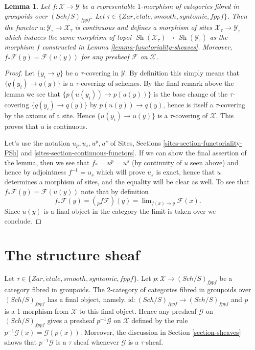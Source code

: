 \documentclass{stacks-project}
\theoremstyle{plain}
\newtheorem{lemma}[subsection]{Lemma}
\theoremstyle{definition}
\theoremstyle{remark}
\numberwithin{equation}{subsection}
\def\lim{\mathop{\mathrm{lim}}\nolimits}
\def\Sch{\mathit{Sch}}
\def\Sh{\mathop{\mathit{Sh}}\nolimits}
\def\etale{{\acute{e}tale}}
\begin{document}
\begin{lemma}
\label{lemma-representable-pushforward}
Let $f : \mathcal{X} \to \mathcal{Y}$ be a representable $1$-morphism of
categories fibred in groupoids over $(\Sch/S)_{fppf}$. Let
$\tau \in \{Zar, \etale, smooth, syntomic, fppf\}$.
Then the functor $u : \mathcal{Y}_\tau \to \mathcal{X}_\tau$ is continuous
and defines a morphism of sites $\mathcal{X}_\tau \to \mathcal{Y}_\tau$
which induces the same morphism of topoi
$\Sh(\mathcal{X}_\tau) \to \Sh(\mathcal{Y}_\tau)$
as the morphism $f$ constructed in
Lemma \ref{lemma-functoriality-sheaves}.
Moreover, $f_*\mathcal{F}(y) = \mathcal{F}(u(y))$ for any presheaf
$\mathcal{F}$ on $\mathcal{X}$.
\end{lemma}

\begin{proof}
Let $\{y_i \to y\}$ be a $\tau$-covering in $\mathcal{Y}$. By definition
this simply means that $\{q(y_i) \to q(y)\}$ is a $\tau$-covering of
schemes. By the final remark above the lemma we see that
$\{p(u(y_i)) \to p(u(y))\}$ is the base change of the $\tau$-covering
$\{q(y_i) \to q(y)\}$ by $p(u(y)) \to q(y)$, hence is itself a
$\tau$-covering by the axioms of a site. Hence $\{u(y_i) \to u(y)\}$
is a $\tau$-covering of $\mathcal{X}$. This proves that $u$ is
continuous.

\medskip\noindent
Let's use the notation $u_p, u_s, u^p, u^s$ of
Sites, Sections \ref{sites-section-functoriality-PSh} and
\ref{sites-section-continuous-functors}.
If we can show the final assertion of the lemma, then we see that
$f_* = u^p = u^s$ (by continuity of $u$ seen above) and hence by adjointness
$f^{-1} = u_s$ which will prove $u_s$ is exact, hence that $u$ determines
a morphism of sites, and the equality will be clear as well.
To see that $f_*\mathcal{F}(y) = \mathcal{F}(u(y))$ note that by
definition
$$
f_*\mathcal{F}(y) = ({}_pf\mathcal{F})(y) =
\lim_{f(x) \to y} \mathcal{F}(x).
$$
Since $u(y)$ is a final object in the category the limit is taken
over we conclude.
\end{proof}





\section{The structure sheaf}
\label{section-structure-sheaf}

\noindent
Let $\tau \in \{Zar, \etale, smooth, syntomic, fppf\}$.
Let $p : \mathcal{X} \to (\Sch/S)_{fppf}$ be a category
fibred in groupoids. The 2-category of categories fibred in groupoids over
$(\Sch/S)_{fppf}$ has a final object, namely,
$\text{id} : (\Sch/S)_{fppf} \to (\Sch/S)_{fppf}$
and $p$ is a $1$-morphism from $\mathcal{X}$ to this final object.
Hence any presheaf $\mathcal{G}$ on $(\Sch/S)_{fppf}$ gives a
presheaf $p^{-1}\mathcal{G}$ on $\mathcal{X}$ defined by the rule
$p^{-1}\mathcal{G}(x) = \mathcal{G}(p(x))$. Moreover, the discussion in
Section \ref{section-sheaves}
shows that $p^{-1}\mathcal{G}$ is a $\tau$ sheaf whenever
$\mathcal{G}$ is a $\tau$-sheaf.
\end{document}
